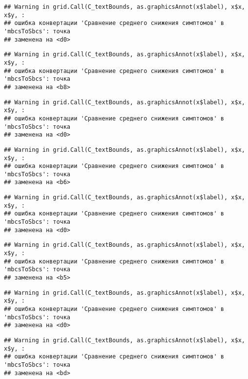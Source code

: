 \documentclass[
]{article}
\begin{document}
\begin{verbatim}
## Warning in grid.Call(C_textBounds, as.graphicsAnnot(x$label), x$x, x$y, :
## ошибка конвертации 'Сравнение среднего снижения симптомов' в 'mbcsToSbcs': точка
## заменена на <d0>
\end{verbatim}

\begin{verbatim}
## Warning in grid.Call(C_textBounds, as.graphicsAnnot(x$label), x$x, x$y, :
## ошибка конвертации 'Сравнение среднего снижения симптомов' в 'mbcsToSbcs': точка
## заменена на <b8>
\end{verbatim}

\begin{verbatim}
## Warning in grid.Call(C_textBounds, as.graphicsAnnot(x$label), x$x, x$y, :
## ошибка конвертации 'Сравнение среднего снижения симптомов' в 'mbcsToSbcs': точка
## заменена на <d0>
\end{verbatim}

\begin{verbatim}
## Warning in grid.Call(C_textBounds, as.graphicsAnnot(x$label), x$x, x$y, :
## ошибка конвертации 'Сравнение среднего снижения симптомов' в 'mbcsToSbcs': точка
## заменена на <b6>
\end{verbatim}

\begin{verbatim}
## Warning in grid.Call(C_textBounds, as.graphicsAnnot(x$label), x$x, x$y, :
## ошибка конвертации 'Сравнение среднего снижения симптомов' в 'mbcsToSbcs': точка
## заменена на <d0>
\end{verbatim}

\begin{verbatim}
## Warning in grid.Call(C_textBounds, as.graphicsAnnot(x$label), x$x, x$y, :
## ошибка конвертации 'Сравнение среднего снижения симптомов' в 'mbcsToSbcs': точка
## заменена на <b5>
\end{verbatim}

\begin{verbatim}
## Warning in grid.Call(C_textBounds, as.graphicsAnnot(x$label), x$x, x$y, :
## ошибка конвертации 'Сравнение среднего снижения симптомов' в 'mbcsToSbcs': точка
## заменена на <d0>
\end{verbatim}

\begin{verbatim}
## Warning in grid.Call(C_textBounds, as.graphicsAnnot(x$label), x$x, x$y, :
## ошибка конвертации 'Сравнение среднего снижения симптомов' в 'mbcsToSbcs': точка
## заменена на <bd>
\end{verbatim}
\end{document}

